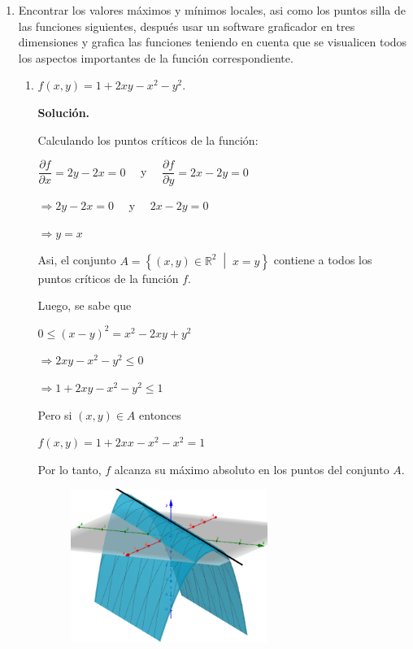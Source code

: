 \documentclass[fleqn, 12pt]{article}
\newcommand{\derivadaparcial}[2]{\dfrac{\partial {#1}}{\partial {#2}}}
\newcommand{\talque}{\; \middle | \;}
\begin{document}
    \begin{enumerate}
        \item Encontrar los valores máximos y mínimos locales, asi como los puntos silla de las funciones siguientes, después usar un software graficador en tres dimensiones y grafica las funciones teniendo en cuenta que se visualicen todos los aspectos importantes de la función correspondiente.
        
        \begin{enumerate}
            \item $ f(x,y) = 1 + 2xy - x^2 - y^2 $.
            
            \textbf{Solución.}

            Calculando los puntos críticos de la función:

            $ \derivadaparcial{f}{x} = 2y - 2x = 0 \quad $ y $ \quad \derivadaparcial{f}{y} = 2x - 2y = 0 $

            $ \Longrightarrow 2y - 2x = 0 \quad $ y $ \quad 2x - 2y = 0 $

            $ \Longrightarrow y = x $

            Asi, el conjunto $ A = \left\lbrace (x,y) \in \mathbb{R}^2 \talque x = y \right\rbrace $ contiene a todos los puntos críticos de la función $ f $.

            Luego, se sabe que

            $ 0 \leq (x - y)^2 = x^2 - 2xy + y^2 $

            $ \Longrightarrow 2xy - x^2 - y^2 \leq 0 $

            $ \Longrightarrow 1 + 2xy - x^2 - y^2 \leq 1 $

            Pero si $ (x,y) \in A $ entonces

            $ f(x,y) = 1 + 2xx - x^2 - x^2 = 1 $

            Por lo tanto, $ f $ alcanza su máximo absoluto en los puntos del conjunto $ A $.

            \begin{figure}[h]
                \centering
                \includegraphics[height = 5cm]{Primero.png}
            \end{figure}


\end{enumerate}
\end{enumerate}
\end{document}
